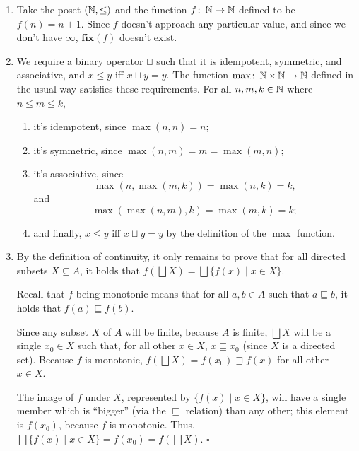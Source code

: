 \begin{enumerate}
    \item Take the poset $(\operatorname{\mathbb{N}}, \leq)$ and the function $f \colon \operatorname{\mathbb{N}} \to \operatorname{\mathbb{N}}$ defined to be $f(n) = n+1$.
    Since $f$ doesn't approach any particular value, and since we don't have $\infty$, $\mathbf{fix}(f)$ doesn't exist.
    
    \item We require a binary operator $\sqcup$ such that it is idempotent, symmetric, and associative, and $x \leq y$ iff $x \sqcup y = y$.
    The function $\max \colon \operatorname{\mathbb{N}} \times \operatorname{\mathbb{N}} \to \operatorname{\mathbb{N}}$ defined in the usual way satisfies these requirements.
    For all $n, m, k \in \operatorname{\mathbb{N}}$ where $n \leq m \leq k$,
    \begin{enumerate}[label=\roman*.]
        \item it's idempotent, since $\max(n, n) = n$;
        \item it's symmetric, since $\max(n, m) = m = \max(m, n)$;
        \item it's associative, since
        \begin{equation*}
            \max(n, \max(m, k)) = \max(n, k) = k,
        \end{equation*}
        and
        \begin{equation*}
            \max(\max(n, m), k) = \max(m, k) = k;
        \end{equation*}
        \item and finally, $x \leq y$ iff $x \sqcup y = y$ by the definition of the $\max$ function.
    \end{enumerate}

    \item By the definition of continuity, it only remains to prove that for all directed subsets $X \subseteq A$, it holds that $f(\bigsqcup X) = \bigsqcup\{f(x) \mid x \in X\}$.
    
    Recall that $f$ being monotonic means that for all $a, b \in A$ such that $a \sqsubseteq b$, it holds that $f(a) \sqsubseteq f(b)$.

    Since any subset $X$ of $A$ will be finite, because $A$ is finite, $\bigsqcup X$ will be a single $x_0 \in X$ such that, for all other $x \in X$, $x \sqsubseteq x_0$ (since $X$ is a directed set).
    Because $f$ is monotonic, $f(\bigsqcup X) = f(x_0) \sqsupseteq f(x)$ for all other $x \in X$.

    The image of $f$ under $X$, represented by $\{f(x) \mid x \in X\}$, will have a single member which is ``bigger'' (via the $\sqsubseteq$ relation) than any other; this element is $f(x_0)$, because $f$ is monotonic.
    Thus, $\bigsqcup\{f(x) \mid x \in X\} = f(x_0) = f(\bigsqcup X)$.
    $\square$


\end{enumerate}

